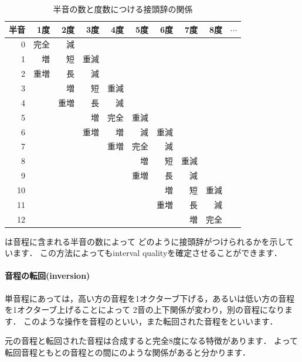 \documentclass[dvipdfmx,uplatex,b5paper,openany,jbase=12Q,nomag*,textwidth-limit=44%
               ]{gachimuchi}
\begin{document}
\begin{table}[ht]
\centering
\caption{半音の数と度数につける接頭辞の関係}%
\begin{tabular}{r||r r r r r r r|r|r}
半音&  1度&  2度&  3度&  4度&  5度&  6度&  7度&  8度&$\cdots$\\\hline
0&    完全&  減&    &    &    &    &    &    &\\
1&    増&    短&    重減&  &    &    &    &    &\\
2&    重増&  長&    減&    &    &    &    &    &\\
3&      &  増&    短&    重減&  &    &    &    &\\
4&      &  重増&  長&    減&    &    &    &    &\\
5&      &    &  増&    完全&  重減&  &    &    &\\
6&      &    &  重増&  増&    減&    重減&  &    &\\
7&      &    &  &    重増&  完全&  減&    &    &\\
8&      &    &  &    &    増&    短&    重減&  &\\
9&      &    &  &    &    重増&  長&    減&    &\\
10&      &    &  &    &    &    増&    短&    重減&\\
11&      &    &  &    &    &    重増&  長&    減&\\
12&      &    &  &    &    &    &    増&    完全&
\end{tabular}
\end{table}

は音程に含まれる半音の数によって
どのように接頭辞がつけられるかを示しています．
この方法によってもinterval qualityを確定させることができます．

\paragraph{音程の転回(inversion)}
単音程にあっては，高い方の音程を1オクターブ下げる，あるいは低い方の音程を1オクターブ上げることによって
2音の上下関係が変わり，別の音程になります．
このような操作を音程のといい，また転回された音程をといいます．

元の音程と転回された音程は合成すると完全8度になる特徴があります．
よって転回音程ともとの音程との間にのような関係があると分かります．
\end{document}
